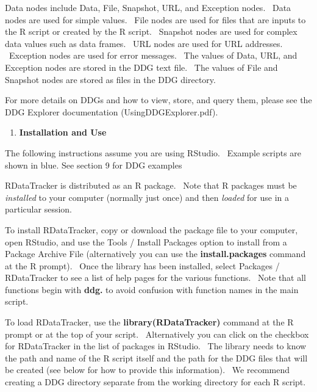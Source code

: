\documentclass[letterpaper]{article}
\newcounter{saveenum}
\newcommand\liststyleWWNumxv{%
\renewcommand\theenumi{\arabic{enumi}}
\renewcommand\theenumii{\alph{enumii}}
\renewcommand\theenumiii{\alph{enumii}.\roman{enumiii}}
\renewcommand\theenumiv{\alph{enumii}.\roman{enumiii}.\arabic{enumiv}}
\renewcommand\labelenumi{\theenumi.}
\renewcommand\labelenumii{\theenumii.}
\renewcommand\labelenumiii{\theenumiii.}
\renewcommand\labelenumiv{\theenumiv.}
}
\begin{document}
\bigskip

Data nodes include Data, File, Snapshot, URL, and Exception nodes. \ Data nodes are used for simple values. \ File nodes are used for files that are inputs to the R script or created by the R script. \ Snapshot nodes are used for complex data values such as data frames. \ URL nodes are used for URL addresses. \ Exception nodes are used for error messages. \ The values of Data, URL, and Exception nodes are stored in the DDG text file. \ The values of File and Snapshot nodes are stored as files in the DDG directory.


\bigskip

For more details on DDGs and how to view, store, and query them, please see the DDG Explorer documentation (UsingDDGExplorer.pdf).


\bigskip

\liststyleWWNumxv
\setcounter{saveenum}{\value{enumi}}
\begin{enumerate}
\setcounter{enumi}{\value{saveenum}}
\item \textbf{Installation and Use}
\end{enumerate}

\bigskip

The following instructions assume you are using RStudio. \ Example scripts are shown in blue. See section 9 for DDG examples


\bigskip

RDataTracker is distributed as an R package. \ Note that R packages must be \textit{installed} to your computer (normally just once) and then \textit{loaded} for use in a particular session.


\bigskip

To install RDataTracker, copy or download the package file to your computer, open RStudio, and use the Tools / Install Packages option to install from a Package Archive File (alternatively you can use the \textbf{install.packages} command at the R prompt). \ Once the library has been installed, select Packages / RDataTracker to see a list of help pages for the various functions. \ Note that all functions begin with \textbf{ddg.} to avoid confusion with function names in the main script.


\bigskip

To load RDataTracker, use the \textbf{library(RDataTracker)} command at the R prompt or at the top of your script. \ Alternatively you can click on the checkbox for RDataTracker in the list of packages in RStudio. \ The library needs to know the path and name of the R script itself and the path for the DDG files that will be created (see below for how to provide this information). \ We recommend creating a DDG directory separate from the working directory for each R script.
\end{document}
